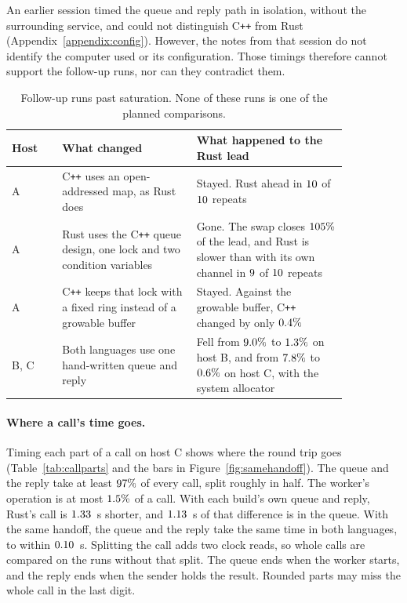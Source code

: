 \documentclass[english,oneside,a4paper,censored,csm,software-track-2020]{HYthesisML}
\begin{document}
An earlier session timed the queue and reply path in isolation, without the surrounding service, 
and could not distinguish C\texttt{++} from Rust (Appendix~\ref{appendix:config}). 
However, the notes from that session do not identify the computer used or its configuration. 
Those timings therefore cannot support the follow-up runs, nor can they contradict them.

\begin{table}[!ht]
\centering
\small
\caption[Follow-up runs past saturation]{Follow-up runs past saturation. None of these runs is one of the planned comparisons.\label{tab:probes}}
\renewcommand{\arraystretch}{1.2}
\setlength{\tabcolsep}{6pt}
\begin{tabular}{@{}l>{\raggedright\arraybackslash}p{0.4\linewidth}%
>{\raggedright\arraybackslash}p{0.45\linewidth}@{}}
\hline\hline
Host & What changed & What happened to the Rust lead \\
\hline
A & C\texttt{++} uses an open-addressed map, as Rust does &
Stayed. Rust ahead in $10$ of $10$ repeats \\
A & Rust uses the C\texttt{++} queue design, one lock and two condition
variables & Gone. The swap closes $105\%$ of the lead, and Rust is slower
than with its own channel in $9$ of $10$ repeats \\
A & C\texttt{++} keeps that lock with a fixed ring instead of a growable
buffer & Stayed. Against the growable buffer, C\texttt{++} changed by only
$0.4\%$ \\
B, C & Both languages use one hand-written queue and reply &
Fell from $9.0\%$ to $1.3\%$ on host B,
and from $7.8\%$ to $0.6\%$ on
host C, with the system allocator \\
\hline
\end{tabular}
\end{table}

\paragraph{Where a call's time goes.}
Timing each part of a call on host C shows where the round trip goes
(Table~\ref{tab:callparts} and the bars in Figure~\ref{fig:samehandoff}). The
queue and the reply take at least $97\%$ of every call,
split roughly in half. The worker's operation is at most
$1.5\%$ of a call. With each build's own queue and reply,
Rust's call is $1.33$~\textmu s shorter, and
$1.13$~\textmu s of that difference is in the queue. With the
same handoff, the queue and the reply take the same time in both languages,
to within $0.10$~\textmu s. Splitting the call adds two clock
reads, so whole calls are compared on the runs without that split. The queue
ends when the worker starts, and the reply ends when the sender holds the
result. Rounded parts may miss the whole call in the last digit.
\end{document}
